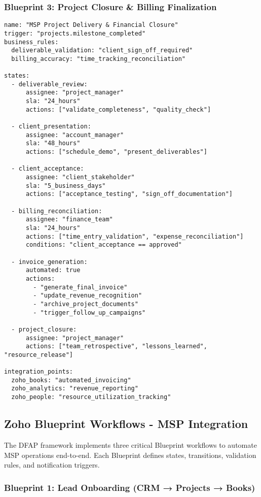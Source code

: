 \subsubsection{Blueprint 3: Project Closure \& Billing Finalization}
\begin{verbatim}
name: "MSP Project Delivery & Financial Closure"
trigger: "projects.milestone_completed"
business_rules:
  deliverable_validation: "client_sign_off_required"
  billing_accuracy: "time_tracking_reconciliation"
  
states:
  - deliverable_review:
      assignee: "project_manager"
      sla: "24_hours"
      actions: ["validate_completeness", "quality_check"]
      
  - client_presentation:
      assignee: "account_manager"
      sla: "48_hours"
      actions: ["schedule_demo", "present_deliverables"]
      
  - client_acceptance:
      assignee: "client_stakeholder"
      sla: "5_business_days"
      actions: ["acceptance_testing", "sign_off_documentation"]
      
  - billing_reconciliation:
      assignee: "finance_team"
      sla: "24_hours"
      actions: ["time_entry_validation", "expense_reconciliation"]
      conditions: "client_acceptance == approved"
      
  - invoice_generation:
      automated: true
      actions:
        - "generate_final_invoice"
        - "update_revenue_recognition"
        - "archive_project_documents"
        - "trigger_follow_up_campaigns"
        
  - project_closure:
      assignee: "project_manager"
      actions: ["team_retrospective", "lessons_learned", "resource_release"]

integration_points:
  zoho_books: "automated_invoicing"
  zoho_analytics: "revenue_reporting"
  zoho_people: "resource_utilization_tracking"
\end{verbatim} 

\subsection{Zoho Blueprint Workflows - MSP Integration}

The DFAP framework implements three critical Blueprint workflows to automate MSP operations end-to-end. Each Blueprint defines states, transitions, validation rules, and notification triggers.

\subsubsection{Blueprint 1: Lead Onboarding (CRM → Projects → Books)}

